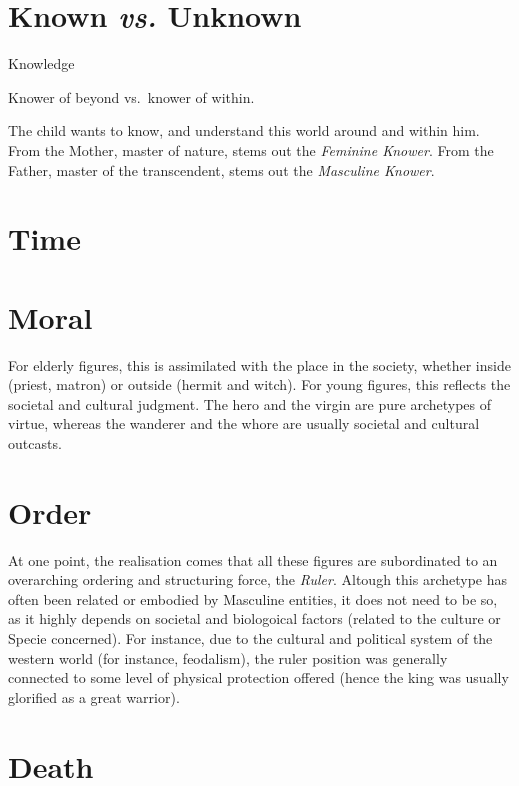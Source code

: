 \documentclass[]{book}
\begin{document}
\hypertarget{known-vs.-unknown}{%
\section{\texorpdfstring{Known \emph{vs.} Unknown}{Known vs. Unknown}}\label{known-vs.-unknown}}

Knowledge

Knower of beyond vs.~knower of within.

The child wants to know, and understand this world around and within him. From the Mother, master of nature, stems out the \emph{Feminine Knower}. From the Father, master of the transcendent, stems out the \emph{Masculine Knower}.

\hypertarget{time}{%
\section{Time}\label{time}}

\hypertarget{moral}{%
\section{Moral}\label{moral}}

For elderly figures, this is assimilated with the place in the society, whether inside (priest, matron) or outside (hermit and witch). For young figures, this reflects the societal and cultural judgment. The hero and the virgin are pure archetypes of virtue, whereas the wanderer and the whore are usually societal and cultural outcasts.

\hypertarget{order}{%
\section{Order}\label{order}}

At one point, the realisation comes that all these figures are subordinated to an overarching ordering and structuring force, the \emph{Ruler}. Altough this archetype has often been related or embodied by Masculine entities, it does not need to be so, as it highly depends on societal and biologoical factors (related to the culture or Specie concerned). For instance, due to the cultural and political system of the western world (for instance, feodalism), the ruler position was generally connected to some level of physical protection offered (hence the king was usually glorified as a great warrior).

\hypertarget{death}{%
\section{Death}\label{death}}
\end{document}
